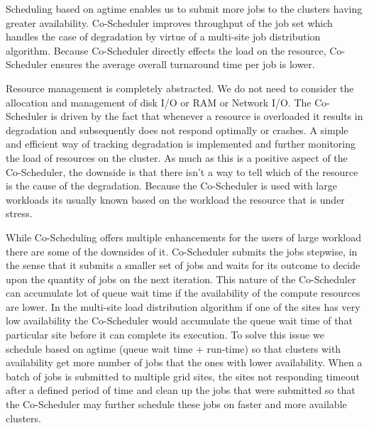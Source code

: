 \documentclass[ms,electronic,double]{nuthesis}
\begin{document}
Scheduling based on agtime enables us to submit more jobs to the clusters having greater availability. Co-Scheduler improves throughput of the job set which handles the 
case of degradation by virtue of a multi-site job distribution algorithm. Because Co-Scheduler directly effects the load on the resource, Co-Scheduler 
ensures the average overall turnaround time per job is lower.

Resource management is completely abstracted. We do not need to consider the 
allocation and management of disk I/O or RAM or Network I/O. The Co-Scheduler is 
driven by the fact that whenever a resource is overloaded it results in 
degradation and subsequently does not respond optimally or crashes. A simple and 
efficient way of tracking degradation is implemented and further monitoring the load of 
resources on the cluster. As much as this is a positive aspect of the 
Co-Scheduler, the downside is that there isn't a way to tell which of the resource is 
the cause of the degradation. Because the Co-Scheduler is used with large workloads its usually known based on 
the workload the resource that is under stress.

While Co-Scheduling offers multiple enhancements for the users of large workload 
there are some of the downsides of it. Co-Scheduler submits the jobs stepwise, in 
the sense that it submits a smaller set of jobs and waits for its outcome to decide upon the quantity 
of jobs on the next iteration. This 
nature of the Co-Scheduler can accumulate lot of queue wait time if the availability 
of the compute resources are lower. In the multi-site load distribution 
algorithm if one of the sites has very low availability the Co-Scheduler would 
accumulate the queue wait time of that particular site before it can complete 
its execution. To solve this issue we schedule based on agtime (queue wait time + run-time) so that clusters with availability 
get more number of jobs that the ones with lower availability. When a batch of 
jobs is submitted to multiple grid sites, the sites not responding timeout after 
a defined period of time and clean up the jobs that were submitted so that the Co-Scheduler may further 
schedule these jobs on faster and more available clusters. 

\backmatter

\appendix




\nocite{*}

\end{document}
